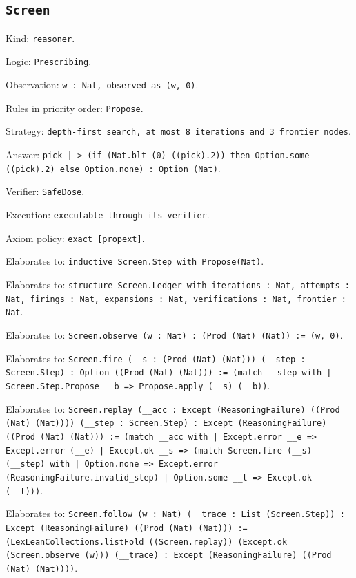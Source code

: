 \documentclass[11pt]{article}
\begin{document}
\subsection*{\texttt{Screen}}
\noindent Kind: \texttt{reasoner}.\par
\noindent Logic: \texttt{Prescribing}.\par
\noindent Observation: \texttt{w : Nat, observed as (w, 0)}.\par
\noindent Rules in priority order: \texttt{Propose}.\par
\noindent Strategy: \texttt{depth-first search, at most 8 iterations and 3 frontier nodes}.\par
\noindent Answer: \texttt{pick |-> (if (Nat.blt (0) ((pick).2)) then Option.some ((pick).2) else Option.none) : Option (Nat)}.\par
\noindent Verifier: \texttt{SafeDose}.\par
\noindent Execution: \texttt{executable through its verifier}.\par
\noindent Axiom policy: \texttt{exact [propext]}.\par
\noindent Elaborates to: \texttt{inductive Screen.Step with Propose(Nat)}.\par
\noindent Elaborates to: \texttt{structure Screen.Ledger with iterations : Nat, attempts : Nat, firings : Nat, expansions : Nat, verifications : Nat, frontier : Nat}.\par
\noindent Elaborates to: \texttt{Screen.observe (w : Nat) : (Prod (Nat) (Nat)) := (w, 0)}.\par
\noindent Elaborates to: \texttt{Screen.fire (\_\_s : (Prod (Nat) (Nat))) (\_\_step : Screen.Step) : Option ((Prod (Nat) (Nat))) := (match \_\_step with | Screen.Step.Propose \_\_b => Propose.apply (\_\_s) (\_\_b))}.\par
\noindent Elaborates to: \texttt{Screen.replay (\_\_acc : Except (ReasoningFailure) ((Prod (Nat) (Nat)))) (\_\_step : Screen.Step) : Except (ReasoningFailure) ((Prod (Nat) (Nat))) := (match \_\_acc with | Except.error \_\_e => Except.error (\_\_e) | Except.ok \_\_s => (match Screen.fire (\_\_s) (\_\_step) with | Option.none => Except.error (ReasoningFailure.invalid\_step) | Option.some \_\_t => Except.ok (\_\_t)))}.\par
\noindent Elaborates to: \texttt{Screen.follow (w : Nat) (\_\_trace : List (Screen.Step)) : Except (ReasoningFailure) ((Prod (Nat) (Nat))) := (LexLeanCollections.listFold ((Screen.replay)) (Except.ok (Screen.observe (w))) (\_\_trace) : Except (ReasoningFailure) ((Prod (Nat) (Nat))))}.\par
\end{document}
